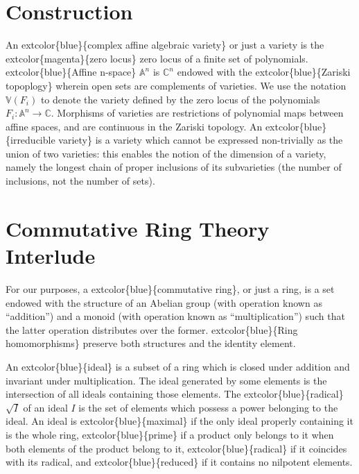 \documentclass[
]{book}
\begin{document}
\hypertarget{construction-4}{%
\section{Construction}\label{construction-4}}

An extcolor\{blue\}\{complex affine algebraic variety\} or just a variety is the extcolor\{magenta\}\{zero locus\} zero locus of a finite set of polynomials. extcolor\{blue\}\{Affine n-space\} \(\mathbb{A}^n\) is \(\mathbb{C}^n\) endowed with the extcolor\{blue\}\{Zariski topoplogy\} wherein open sets are complements of varieties. We use the notation \(\mathbb{V}(F_i)\) to denote the variety defined by the zero locus of the polynomials \(F_i : \mathbb{A}^n \to \mathbb{C}\). Morphisms of varieties are restrictions of polynomial maps between affine spaces, and are continuous in the Zariski topology. An extcolor\{blue\}\{irreducible variety\} is a variety which cannot be expressed non-trivially as the union of two varieties: this enables the notion of the dimension of a variety, namely the longest chain of proper inclusions of its subvarieties (the number of inclusions, not the number of sets).

\hypertarget{commutative-ring-theory-interlude}{%
\section{Commutative Ring Theory Interlude}\label{commutative-ring-theory-interlude}}

For our purposes, a extcolor\{blue\}\{commutative ring\}, or just a ring, is a set endowed with the structure of an Abelian group (with operation known as ``addition'') and a monoid (with operation known as ``multiplication'') such that the latter operation distributes over the former. extcolor\{blue\}\{Ring homomorphisms\} preserve both structures and the identity element.

An extcolor\{blue\}\{ideal\} is a subset of a ring which is closed under addition and invariant under multiplication. The ideal generated by some elements is the intersection of all ideals containing those elements. The extcolor\{blue\}\{radical\} \(\sqrt{I}\) of an ideal \(I\) is the set of elements which possess a power belonging to the ideal. An ideal is extcolor\{blue\}\{maximal\} if the only ideal properly containing it is the whole ring, extcolor\{blue\}\{prime\} if a product only belongs to it when both elements of the product belong to it, extcolor\{blue\}\{radical\} if it coincides with its radical, and extcolor\{blue\}\{reduced\} if it contains no nilpotent elements.
\end{document}

